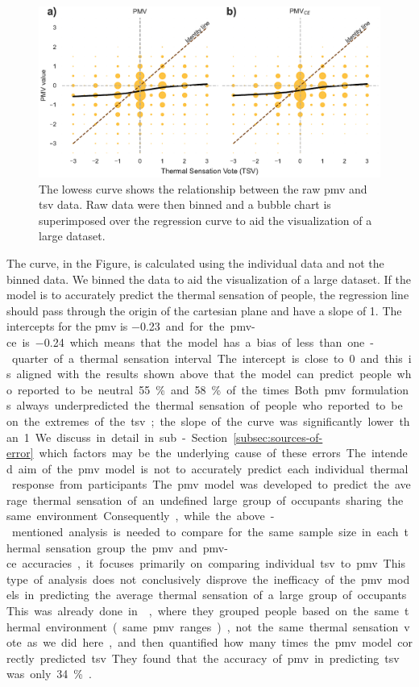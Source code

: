 \begin{figure}[htb!]
    \centering
    \includegraphics[width=\textwidth]{figures/bubble_models_vs_tsv}
    \caption{The \ac{lowess} curve shows the relationship between the raw \ac{pmv} and \ac{tsv} data.
    Raw data were then binned and a bubble chart is superimposed over the regression curve to aid the visualization of a large dataset.}
    \label{fig:bubble_models_vs_tsv}
\end{figure}
The curve, in the Figure, is calculated using the individual data and not the binned data.
We binned the data to aid the visualization of a large dataset.
If the model is to accurately predict the thermal sensation of people, the regression line should pass through the origin of the cartesian plane and have a slope of 1.
The intercepts for the \ac{pmv} is \qty{-0.23} and for the \ac{pmv-ce} is \qty{-0.24} which means that the model has a bias of less than one-quarter of a thermal sensation interval. 
The intercept is close to 0 and this is aligned with the results shown above that the model can predict people who reported to be neutral \qty{55}{\percent} and \qty{58}{\percent} of the times.
Both \ac{pmv} formulations always underpredicted the thermal sensation of people who reported to be on the extremes of the \ac{tsv}; the slope of the curve was significantly lower than 1.
We discuss in detail in sub-Section~\ref{subsec:sources-of-error} which factors may be the underlying cause of these errors.

The intended aim of the \ac{pmv} model is not to accurately predict each individual thermal response from participants.
The \ac{pmv} model was developed to predict the average thermal sensation of an undefined large group of occupants sharing the same environment.
Consequently, while the above-mentioned analysis is needed to compare for the same sample size in each thermal sensation group the \ac{pmv} and \ac{pmv-ce} accuracies, it focuses primarily on comparing individual \ac{tsv} to \ac{pmv}.
This type of analysis does not conclusively disprove the inefficacy of the \ac{pmv} models in predicting the average thermal sensation of a large group of occupants.
This was already done in , where they grouped people based on the same thermal environment (same \ac{pmv} ranges), not the same thermal sensation vote as we did here, and then quantified how many times the \ac{pmv} model correctly predicted \ac{tsv}. 
They found that the accuracy of \ac{pmv} in predicting \ac{tsv} was only \qty{34}{\percent} . 

